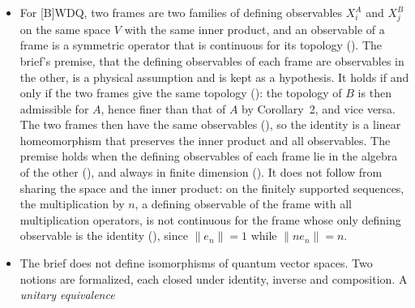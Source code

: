\documentclass[11pt]{article}
\begin{document}
\begin{itemize}
  topology is the quotient topology from the nonzero vectors, which is Mathlib's
  . With a definite inner product, $V$ is second
  countable if and only if $\mathbb{P}(V)$ is
  (), so the claim of Sec.~5 holds with the
  topology of Definition~1 itself; nothing has to be extended. One direction holds because the
  quotient map is open. For the other, on the open set where $\langle v_0, v\rangle \ne 0$ the
  map $v \mapsto ([v], \langle v_0, v\rangle)$ is an embedding into the second-countable
  space $\mathbb{P}(V) \times \mathbb{C}$ (); countably
  many such sets cover the nonzero vectors, because $\mathbb{P}(V)$ is Lindel\"of, and a translate
  of one of them covers $0$. The topology that the ensembles would induce on the pure states is
  not compared with the quotient topology, since the brief defines no ensemble space over $V$.
\item For [B]WDQ, two frames are two families of defining observables $X^A_i$ and $X^B_j$ on the
  same space $V$ with the same inner product, and an observable of a frame is a symmetric
  operator that is continuous for its topology (). The brief's premise, that
  the defining observables of each frame are observables in the other, is a physical assumption
  and is kept as a hypothesis. It holds if and only if the two frames give the same topology
  (): the topology of $B$ is then admissible for $A$, hence
  finer than that of $A$ by Corollary~2, and vice versa. The two frames then have the same
  observables (), so the identity is a linear homeomorphism that
  preserves the inner product and all observables. The premise holds when the defining
  observables of each frame lie in the algebra of the other (),
  and always in finite dimension (). It does not follow
  from sharing the space and the inner product: on the finitely supported sequences, the
  multiplication by $n$, a defining observable of the frame with all multiplication operators,
  is not continuous for the frame whose only defining observable is the identity
  (), since $\|e_n\| = 1$ while $\|n e_n\| = n$.
\item The brief does not define isomorphisms of quantum vector spaces. Two notions are
  formalized, each closed under identity, inverse and composition. A \emph{unitary equivalence}

\end{itemize}
\end{document}
